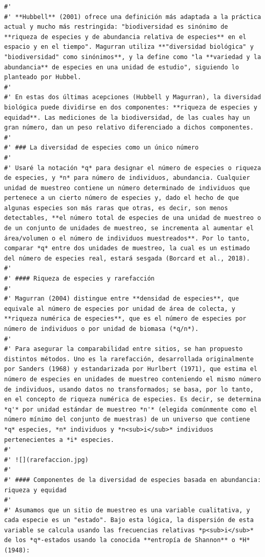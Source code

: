 \documentclass[11pt,]{article}
\begin{document}
\begin{verbatim}
#' 
#' **Hubbell** (2001) ofrece una definición más adaptada a la práctica actual y mucho más restringida: "biodiversidad es sinónimo de **riqueza de especies y de abundancia relativa de especies** en el espacio y en el tiempo". Magurran utiliza **"diversidad biológica" y "biodiversidad" como sinónimos**, y la define como "la **variedad y la abundancia** de especies en una unidad de estudio", siguiendo lo planteado por Hubbel.
#' 
#' En estas dos últimas acepciones (Hubbell y Magurran), la diversidad biológica puede dividirse en dos componentes: **riqueza de especies y equidad**. Las mediciones de la biodiversidad, de las cuales hay un gran número, dan un peso relativo diferenciado a dichos componentes. 
#' 
#' ### La diversidad de especies como un único número
#' 
#' Usaré la notación *q* para designar el número de especies o riqueza de especies, y *n* para número de individuos, abundancia. Cualquier unidad de muestreo contiene un número determinado de individuos que pertenece a un cierto número de especies y, dado el hecho de que algunas especies son más raras que otras, es decir, son menos detectables, **el número total de especies de una unidad de muestreo o de un conjunto de unidades de muestreo, se incrementa al aumentar el área/volumen o el número de individuos muestreados**. Por lo tanto, comparar *q* entre dos unidades de muestreo, la cual es un estimado del número de especies real, estará sesgada (Borcard et al., 2018).
#' 
#' #### Riqueza de especies y rarefacción
#' 
#' Magurran (2004) distingue entre **densidad de especies**, que equivale al número de especies por unidad de área de colecta, y **riqueza numérica de especies**, que es el número de especies por número de individuos o por unidad de biomasa (*q/n*).
#' 
#' Para asegurar la comparabilidad entre sitios, se han propuesto distintos métodos. Uno es la rarefacción, desarrollada originalmente por Sanders (1968) y estandarizada por Hurlbert (1971), que estima el número de especies en unidades de muestreo conteniendo el mismo número de individuos, usando datos no transformados; se basa, por lo tanto, en el concepto de riqueza numérica de especies. Es decir, se determina *q'* por unidad estándar de muestreo *n'* (elegida comúnmente como el número mínimo del conjunto de muestras) de un universo que contiene *q* especies, *n* individuos y *n<sub>i</sub>* individuos pertenecientes a *i* especies.
#' 
#' ![](rarefaccion.jpg)
#' 
#' #### Componentes de la diversidad de especies basada en abundancia: riqueza y equidad
#' 
#' Asumamos que un sitio de muestreo es una variable cualitativa, y cada especie es un "estado". Bajo esta lógica, la dispersión de esta variable se calcula usando las frecuencias relativas *p<sub>i</sub>* de los *q*-estados usando la conocida **entropía de Shannon** o *H* (1948):

\end{verbatim}
\end{document}
